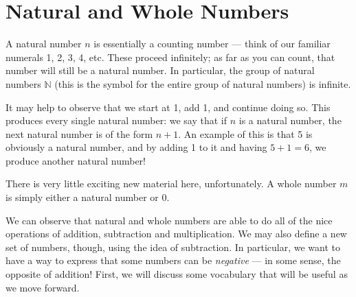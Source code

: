 \documentclass[openany]{book}
\begin{document}
\section{Natural and Whole Numbers}
\begin{definition}
	A natural number $n$ is essentially a counting number --- think of our familiar numerals 1, 2, 3, 4, etc. These proceed infinitely; as far as you can count, that number will still be a natural number. In particular, the group of natural numbers $\mathbb{N}$ (this is the symbol for the entire group of natural numbers) is infinite.
\end{definition}
\begin{remark}
	It may help to observe that we start at 1, add 1, and continue doing so. This produces every single natural number: we say that if $n$ is a natural number, the next natural number is of the form $n+1$. An example of this is that 5 is obviously a natural number, and by adding 1 to it and having $5+1=6$, we produce another natural number!
\end{remark}
\begin{definition}
	There is very little exciting new material here, unfortunately. A whole number $m$ is simply either a natural number or 0.
\end{definition}
We can observe that natural and whole numbers are able to do all of the nice operations of addition, subtraction and multiplication. We may also define a new set of numbers, though, using the idea of subtraction. In particular, we want to have a way to express that some numbers can be \textit{negative} --- in some sense, the opposite of addition! First, we will discuss some vocabulary that will be useful as we move forward.
\end{document}
